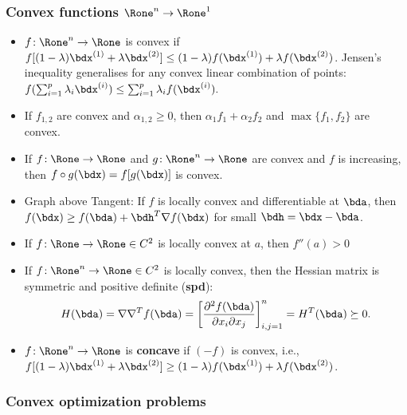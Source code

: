 \documentclass[a4paper]{article}
\begin{document}
\subsubsection*{Convex functions $\Rone^n\to\Rone^1$}%

\begin{itemize}
  \item $f\!:\Rone^n\to\Rone$ is convex if
    $
    f[(1-\lambda)\bdx^{(1)}+\lambda\bdx^{(2)}]
    \le
    (1-\lambda) f(\bdx^{(1)})+\lambda f(\bdx^{(2)})
    $.
    Jensen's inequality generalises for any convex linear combination of points:
    $
    f(\sum_{i=1}^p\lambda_i\bdx^{(i)})
    \le
    \sum_{i=1}^p\lambda_i f(\bdx^{(i)}).
    $

  \item If $f_{1,2}$ are convex and $\alpha_{1,2}\ge0$, then $\alpha_1f_1+\alpha_2 f_2$
    and $\max\{f_1,f_2\}$ are convex.

  \item If
    $f\!:\Rone\to\Rone$
    and
    $g\!:\Rone^n\to\Rone$
    are convex and $f$ is increasing, then
    $f\circ g(\bdx)=f[g(\bdx)]$ is convex.

  \item Graph above Tangent: If $f$ is locally convex and differentiable at $\bda$, then
  $f(\bdx)\ge f(\bda)+\bdh^T\nabla f(\bdx)$ for small $\bdh=\bdx-\bda$.

  \item If $f\!:\Rone\to\Rone\in C^2$ is locally convex at $a$, then $f''(a)>0$

  \item If $f\!:\Rone^n\to\Rone\in C^2$ is locally convex, then the
    Hessian matrix is symmetric and positive definite (\textbf{spd}):
    \[
      H(\bda)=\nabla\nabla^T f(\bda)
      =
      \left[\frac{\partial^2f(\bda)}{ \partial x_i\partial x_j}\right]_{i,j=1}^n
      =H^T(\bda)\succeq 0.
    \]

   \item  $f\!:\Rone^n\to\Rone$ is \textbf{concave} if $(-f)$ is convex, i.e.,
    $
    f[(1-\lambda)\bdx^{(1)}+\lambda\bdx^{(2)}]
    \ge
    (1-\lambda) f(\bdx^{(1)})+\lambda f(\bdx^{(2)})
    $.

\end{itemize}

\subsubsection*{Convex optimization problems}%
\end{document}
